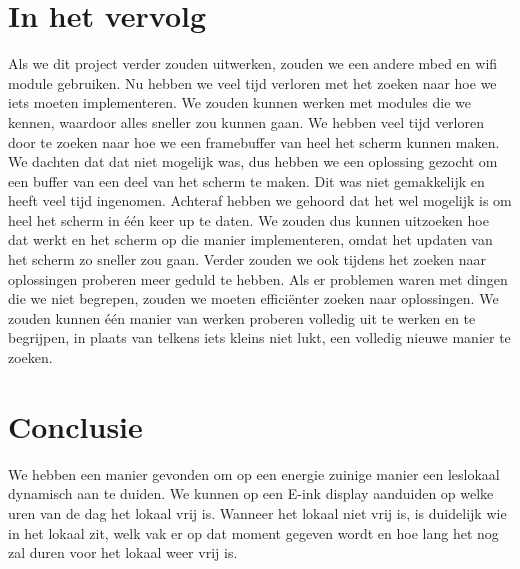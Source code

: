 \documentclass[a4paper,kul]{kulakarticle} %
\begin{document}
\newpage

\section{In het vervolg}

Als we dit project verder zouden uitwerken, zouden we een andere mbed en wifi module gebruiken. Nu hebben we veel tijd verloren met het zoeken naar hoe we iets moeten implementeren. We zouden kunnen werken met modules die we kennen, waardoor alles sneller zou kunnen gaan. 
\newline
\newline
We hebben veel tijd verloren door te zoeken naar hoe we een framebuffer van heel het scherm kunnen maken. We dachten dat dat niet mogelijk was, dus hebben we een oplossing gezocht om een buffer van een deel van het scherm te maken. Dit was niet gemakkelijk en heeft veel tijd ingenomen. Achteraf hebben we gehoord dat het wel mogelijk is om heel het scherm in één keer up te daten. We zouden dus kunnen uitzoeken hoe dat werkt en het scherm op die manier implementeren, omdat het updaten van het scherm zo sneller zou gaan. 
\newline
\newline
Verder zouden we ook tijdens het zoeken naar oplossingen proberen meer geduld te hebben. Als er problemen waren met dingen die we niet begrepen, zouden we moeten efficiënter zoeken naar oplossingen. We zouden kunnen één manier van werken proberen volledig uit te werken en te begrijpen, in plaats van telkens iets kleins niet lukt, een volledig nieuwe manier te zoeken.

\newpage

\section{Conclusie}

We hebben een manier gevonden om op een energie zuinige manier een leslokaal dynamisch aan te duiden. We kunnen op een E-ink display aanduiden op welke uren van de dag het lokaal vrij is. Wanneer het lokaal niet vrij is, is duidelijk wie in het lokaal zit, welk vak er op dat moment gegeven wordt en hoe lang het nog zal duren voor het lokaal  weer vrij is.

\newpage



\end{document}
